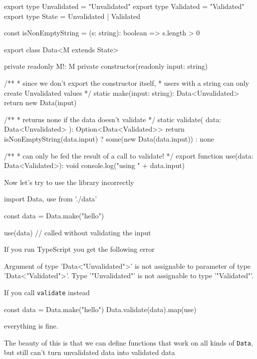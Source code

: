\documentclass[12pt]{article}
\theoremstyle{definition}
\newenvironment{code}
  {\vspace{0.5cm} \VerbatimEnvironment\begin{typescriptcode}}
  {\end{typescriptcode} \vspace{0.2cm}}
\begin{document}
\begin{code}
export type Unvalidated = "Unvalidated"
export type Validated = "Validated"
export type State = Unvalidated | Validated

const isNonEmptyString = (s: string): boolean => s.length > 0

export class Data<M extends State> {
  private readonly M!: M
  private constructor(readonly input: string) {}

  /**
   * since we don't export the constructor itself,
   * users with a string can only create Unvalidated values
   */
  static make(input: string): Data<Unvalidated> {
    return new Data(input)
  }

  /**
   * returns none if the data doesn't validate
   */
  static validate(
    data: Data<Unvalidated>
  ): Option<Data<Validated>> {
    return isNonEmptyString(data.input)
      ? some(new Data(data.input))
      : none
  }
}

/**
 * can only be fed the result of a call to validate!
 */
export function use(data: Data<Validated>): void {
  console.log("using " +  data.input)
}
\end{code}

Now let's try to use the library incorrectly

\begin{code}
import { Data, use } from './data'

const data = Data.make("hello")

use(data) // called without validating the input
\end{code}

If you run TypeScript you get the following error

\begin{code}
[ts]
Argument of type 'Data<"Unvalidated">' is not assignable
  to parameter of type 'Data<"Validated">'.
  Type '"Unvalidated"' is not assignable to type '"Validated"'.
\end{code}

If you call \texttt{validate} instead

\begin{code}
const data = Data.make("hello")
Data.validate(data).map(use)
\end{code}

everything is fine.

The beauty of this is that we can define functions that work on all kinds of \texttt{Data},
but still can't turn unvalidated data into validated data
\end{document}
